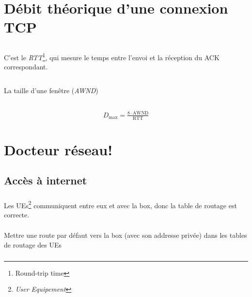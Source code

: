 \documentclass{article}
\begin{document}
\section{Débit théorique d'une connexion TCP}

\subsection{}
C'est le \emph{RTT}\footnote{Round-trip time}, qui mesure le temps entre l'envoi et la réception du ACK correspondant.

\subsection{}
La taille d'une fenêtre (\emph{AWND})

\subsection{}
\begin{align*}
    D_\text{max} = \frac{8  \cdot  \text{AWND}}{\text{RTT}}
\end{align*}

\section{Docteur réseau!}

\subsection{Accès à internet}

\subsubsection{}

Les UEs\footnote{ \emph{User Equipement}  } communiquent entre eux et avec la box, donc la table de routage est correcte.

\subsubsection{}

Mettre une route par défaut vers la box (avec son addresse privée) dans les tables de routage des UEs

\subsubsection{}
\end{document}

